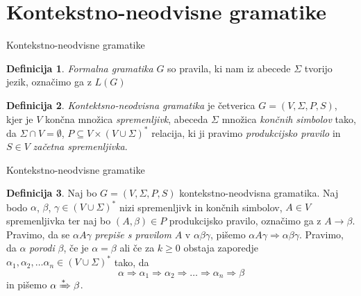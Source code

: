 \documentclass{beamer}
\theoremstyle{definition} %
\newtheorem{definicija}{Definicija}[section]
\theoremstyle{plain} %
\begin{document}
\section*{Kontekstno-neodvisne gramatike}

\begin{frame}{Kontekstno-neodvisne gramatike}
    
    \begin{definicija}

        \textit{Formalna gramatika} $ G $ so pravila, ki nam iz abecede $ \Sigma $ tvorijo jezik,
        označimo ga z $ L(G) $
    
    \end{definicija}
    
    \pause

    \begin{definicija}
    
        \textit{Kontektsno-neodvisna gramatika} je četverica $ G = ( V, \Sigma, P, S ) $, kjer je
        $ V $ končna množica \textit{spremenljivk}, abeceda $ \Sigma $ množica \textit{končnih simbolov} tako,
        da $ \Sigma \cap V = \emptyset $, $ P \subseteq V \times ( V \cup \Sigma )^* $ relacija, ki ji
        pravimo \textit{produkcijsko pravilo} in $ S \in V $ \textit{začetna spremenljivka}.
    
    \end{definicija}

\end{frame}

\begin{frame}{Kontekstno-neodvisne gramatike}
    
    \begin{definicija}
    
        Naj bo $ G = ( V, \Sigma, P, S ) $ kontekstno-neodvisna gramatika. Naj bodo $ \alpha $,
        $ \beta $, $ \gamma \in ( V \cup \Sigma )^* $ nizi spremenljivk in končnih simbolov,
        $ A \in V $ spremenljivka ter naj bo $ ( A, \beta ) \in P $ produkcijsko pravilo,
        označimo ga z $ A \rightarrow \beta $. Pravimo, da se $ \alpha A \gamma $ 
        \textit{prepiše s pravilom} $ A $ v $ \alpha\beta\gamma $, pišemo $ \alpha A \gamma  \Rightarrow 
        \alpha\beta\gamma $. Pravimo, da $ \alpha $ \textit{porodi} $ \beta $, če je $ \alpha = \beta $ ali če
        za $ k \geq 0 $ obstaja zaporedje $ \alpha_1, \alpha_2, \ldots \alpha_n
        \in ( V \cup \Sigma )^* $ tako, da 
        \[
            \alpha \Rightarrow \alpha_1 \Rightarrow \alpha_2 \Rightarrow \ldots \Rightarrow \alpha_n
            \Rightarrow \beta
        \]
        in pišemo $ \alpha \xRightarrow{*} \beta $.
    
    \end{definicija}

\end{frame}
\end{document}
